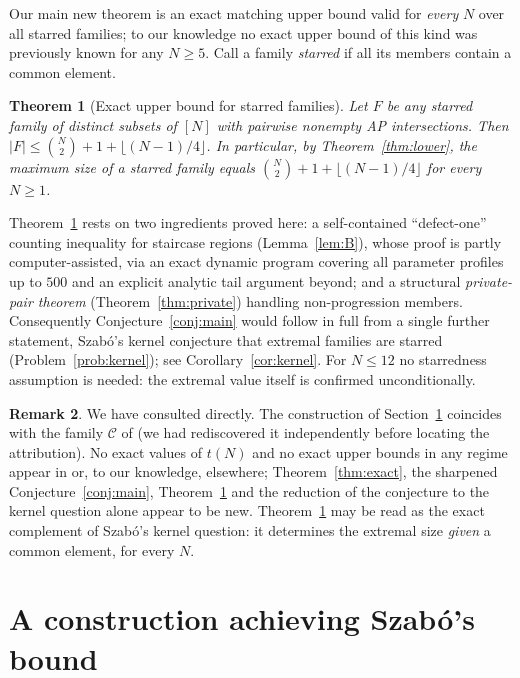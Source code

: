 \documentclass[11pt]{article}
\newtheorem{theorem}{Theorem}[section]
\theoremstyle{definition}
\newtheorem{remark}[theorem]{Remark}
\begin{document}
Our main new theorem is an exact matching upper bound valid for \emph{every} $N$ over all starred families; to our knowledge no exact upper bound of this kind was previously known for any $N\ge5$. Call a family \emph{starred} if all its members contain a common element.

\begin{theorem}[Exact upper bound for starred families]\label{thm:upper}
Let $F$ be any starred family of distinct subsets of $[N]$ with pairwise nonempty AP intersections. Then $|F|\le \binom N2+1+\lfloor (N-1)/4\rfloor$. In particular, by Theorem~\ref{thm:lower}, the maximum size of a starred family equals $\binom N2+1+\lfloor (N-1)/4\rfloor$ for every $N\ge1$.
\end{theorem}

Theorem~\ref{thm:upper} rests on two ingredients proved here: a self-contained ``defect-one'' counting inequality for staircase regions (Lemma~\ref{lem:B}), whose proof is partly computer-assisted, via an exact dynamic program covering all parameter profiles up to $500$ and an explicit analytic tail argument beyond; and a structural \emph{private-pair theorem} (Theorem~\ref{thm:private}) handling non-progression members. Consequently Conjecture~\ref{conj:main} would follow in full from a single further statement, Szab\'o's kernel conjecture that extremal families are starred (Problem~\ref{prob:kernel}); see Corollary~\ref{cor:kernel}. For $N\le 12$ no starredness assumption is needed: the extremal value itself is confirmed unconditionally.

\begin{remark}
We have consulted \cite{Sz99} directly. The construction of Section~\ref{sec:construction} coincides with the family $\mathcal C$ of \cite[\S5]{Sz99} (we had rediscovered it independently before locating the attribution). No exact values of $t(N)$ and no exact upper bounds in any regime appear in \cite{Sz99} or, to our knowledge, elsewhere; Theorem~\ref{thm:exact}, the sharpened Conjecture~\ref{conj:main}, Theorem~\ref{thm:upper} and the reduction of the conjecture to the kernel question alone appear to be new. Theorem~\ref{thm:upper} may be read as the exact complement of Szab\'o's kernel question: it determines the extremal size \emph{given} a common element, for every $N$.
\end{remark}

\section{A construction achieving Szab\'o's bound}\label{sec:construction}
\end{document}
